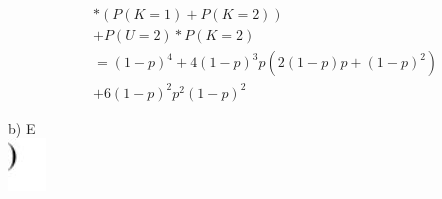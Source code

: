 \documentclass[10pt]{article}
\begin{document}
{$$
\begin{aligned}
& *(P(K=1)+P(K=2)) \\
&+P(U=2) * P(K=2) \\
&=(1-p)^{4}+4(1-p)^{3} p\left(2(1-p) p+(1-p)^{2}\right) \\
&+6(1-p)^{2} p^{2}(1-p)^{2}
\end{aligned}
$$

b) E\\
\includegraphics[max width=\textwidth, center]{2024_12_29_0906b02acf849bda8665g-5(17)}\\
}
\end{document}
